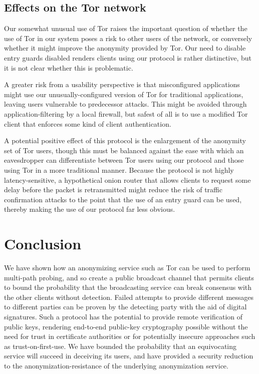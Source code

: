\documentclass[USenglish]{llncs}
\begin{document}
\subsection{Effects on the Tor network}

Our somewhat unusual use of Tor raises the important question of whether the
use of Tor in our system poses a risk to other users of the network, or
conversely whether it might improve the anonymity provided by Tor.
Our need to disable entry guards disabled renders clients using our protocol
is rather distinctive, but it is not clear whether this is problematic.

A greater risk from a usability perspective is that misconfigured applications might use
our unusually-configured version of Tor for traditional applications, leaving
users vulnerable to predecessor attacks.  This might be avoided through
application-filtering by a local firewall, but safest of all is to use a modified Tor
client that enforces some kind of client authentication.

A potential positive effect of this protocol is the enlargement of the
anonymity set of Tor users, though this must be balanced against the
ease with which an eavesdropper can differentiate between Tor users
using our protocol and those using Tor in a more traditional manner.  Because
the protocol is not highly latency-sensitive, a hypothetical onion router
that allows clients to request some delay before
the packet is retransmitted might reduce the risk of traffic confirmation attacks
to the point that the use of an entry guard can be used, thereby making
the use of our protocol far less obvious.
\section{Conclusion}

We have shown how an anonymizing service such as Tor can be used to perform
multi-path probing, and so create
a public broadcast channel that permits clients to bound the probability that the
broadcasting service can break consensus with the other clients without detection.
Failed attempts to provide different messages to
different parties can be proven by the detecting party with the aid of digital
signatures.  Such a protocol has the potential to provide remote verification of
public keys, rendering end-to-end public-key cryptography possible without the
need for trust in certificate authorities or for potentially insecure approaches such
as trust-on-first-use.  We have bounded the probability that an equivocating
service will succeed in deceiving its users, and have provided a security reduction
to the anonymization-resistance of the underlying anonymization service.
\end{document}
